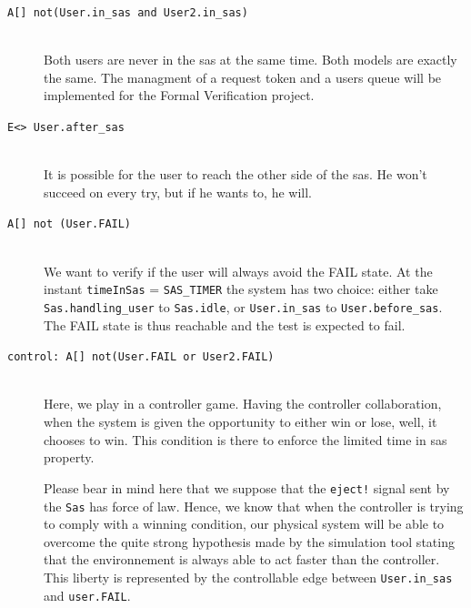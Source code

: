 \begin{description}
        
    \item[\texttt{A[] not(User.in\_sas and User2.in\_sas)}] ~\\     
    Both users are never in the sas at the same time.
    Both models are exactly the same. The managment of a request token and a users queue will be implemented for the Formal Verification project.
    
    
    \item[\texttt{E<> User.after\_sas}] ~\\
    	It is possible for the user to reach the other side of the sas. He won't succeed on every try, but if he wants to, he will.

    \item[\texttt{A[] not (User.FAIL)}] ~\\
    	We want to verify if the user will always avoid the FAIL state.
        At the instant \texttt{timeInSas} = \texttt{SAS\_TIMER} the system has two choice: either take \texttt{Sas.handling\_user} to \texttt{Sas.idle}, or \texttt{User.in\_sas} to \texttt{User.before\_sas}.
        The FAIL state is thus reachable and the test is expected to fail.
    
    \item[\texttt{control: A[] not(User.FAIL or User2.FAIL)}] ~\\
    Here, we play in a controller game.
    Having the controller collaboration, when the system is given the opportunity to either win or lose, well, it chooses to win.
    This condition is there to enforce the limited time in sas property.
    
    Please bear in mind here that we suppose that the \texttt{eject!} signal sent by the \texttt{Sas} has force of law.
    Hence, we know that when the controller is trying to comply with a winning condition, our physical system will be able to overcome the quite strong hypothesis made by the simulation tool stating that the environnement is always able to act faster than the controller.
    This liberty is represented by the controllable edge between \texttt{User.in\_sas} and \texttt{user.FAIL}.
\end{description}

